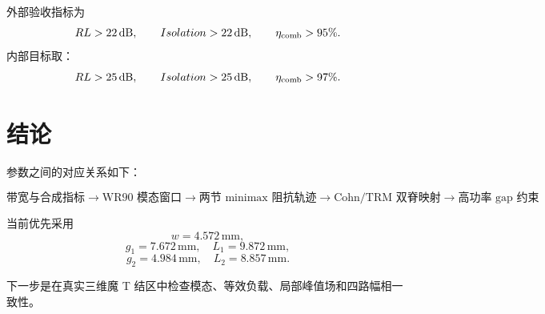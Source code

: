 \documentclass[11pt,a4paper]{ctexart}
\begin{document}
外部验收指标为
\[
RL>22\,\mathrm{dB},
\qquad
Isolation>22\,\mathrm{dB},
\qquad
\eta_{\rm comb}>95\%.
\]
内部目标取：
\[
RL>25\,\mathrm{dB},
\qquad
Isolation>25\,\mathrm{dB},
\qquad
\eta_{\rm comb}>97\%.
\]

\section{结论}

参数之间的对应关系如下：

\[
\boxed{
\text{带宽与合成指标}
\rightarrow
\text{WR90 模态窗口}
\rightarrow
\text{两节 minimax 阻抗轨迹}
\rightarrow
\text{Cohn/TRM 双脊映射}
\rightarrow
\text{高功率 gap 约束}
}.
\]

当前优先采用
\[
\boxed{w=4.572\,\mathrm{mm}},
\]
\[
\boxed{g_1=7.672\,\mathrm{mm},\quad L_1=9.872\,\mathrm{mm}},
\]
\[
\boxed{g_2=4.984\,\mathrm{mm},\quad L_2=8.857\,\mathrm{mm}}.
\]

下一步是在真实三维魔 T 结区中检查模态、等效负载、局部峰值场和四路幅相一致性。
\end{document}
